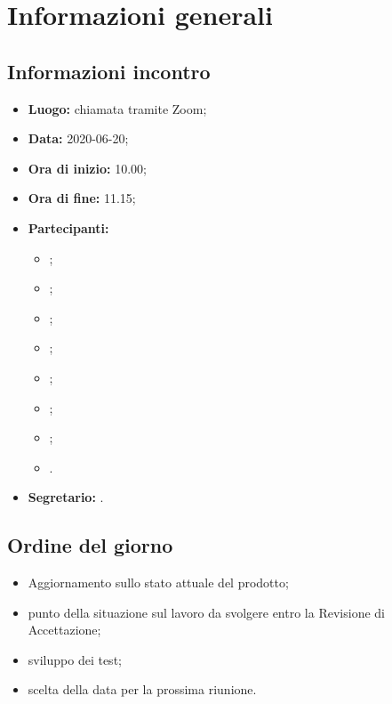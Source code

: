 \section{Informazioni generali}
\subsection{Informazioni incontro}
\begin{itemize}
	\item \textbf{Luogo:} chiamata tramite Zoom;
	\item \textbf{Data:} 2020-06-20;
	\item \textbf{Ora di inizio:} 10.00;
	\item \textbf{Ora di fine:} 11.15;
	\item \textbf{Partecipanti:}
		\begin{itemize}
			\item \VB;
			\item \LB;
			\item \NF;
			\item \EG;
			\item \FJ;
			\item \MP;
			\item \AS;
			\item \AZ.
		\end{itemize}
	\item \textbf{Segretario:} \NF.
\end{itemize}

\subsection{Ordine del giorno}
\begin{itemize}
	\item Aggiornamento sullo stato attuale del prodotto;
	\item punto della situazione sul lavoro da svolgere entro la Revisione di Accettazione;
	\item sviluppo dei test;
	\item scelta della data per la prossima riunione.
\end{itemize}
